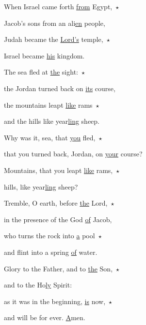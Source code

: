 \noindent When Israel came forth \uline{from} Egypt,~$\star$~\nopagebreak

Jacob’s sons from an ali\uline{en} people,

\noindent Judah became the \uline{Lord’s} temple,~$\star$~\nopagebreak

Israel became \uline{his} kingdom.

\noindent The sea fled at \uline{the} sight:~$\star$~\nopagebreak

the Jordan turned back on \uline{its} course,

\noindent the mountains leapt \uline{like} rams~$\star$~\nopagebreak

and the hills like year\uline{ling} sheep.

\noindent Why was it, sea, that \uline{you} fled,~$\star$~\nopagebreak

that you turned back, Jordan, on \uline{your} course?

\noindent Mountains, that you leapt \uline{like} rams,~$\star$~\nopagebreak

hills, like year\uline{ling} sheep?

\noindent Tremble, O earth, before \uline{the} Lord,~$\star$~\nopagebreak

in the presence of the God \uline{of} Jacob,

\noindent who turns the rock into \uline{a} pool~$\star$~\nopagebreak

and flint into a spring \uline{of} water.

\noindent Glory to the Father, and to \uline{the} Son,~$\star$~\nopagebreak

and to the Ho\uline{ly} Spirit:

\noindent as it was in the beginning, \uline{is} now,~$\star$~\nopagebreak

and will be for ever. \uline{A}men.

